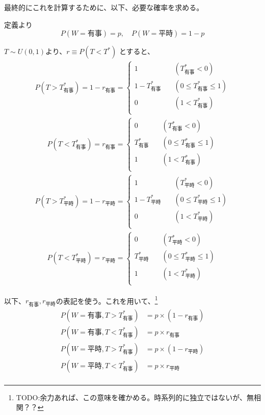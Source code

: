 \documentclass[main.tex]{subfiles}
\begin{document}
最終的にこれを計算するために、以下、必要な確率を求める。

定義より
$$P(W={有事}) = p, \quad P(W={平時}) = 1-p$$


$T \sim U(0,1)$より、$r \equiv P(T<T^*)$ とすると、 
\begin{align*}
    P(T>T^*_{有事}) = 1-r_{有事} = 
    \begin{cases}
        1 \quad &(T^*_{有事} < 0)\\
        1-T^*_{有事} \quad &(0\le T^*_{有事} \le 1)\\
        0 \quad &(1 < T^*_{有事} )\\
    \end{cases}
\end{align*}
\begin{align*}
    P(T<T^*_{有事}) = r_{有事} = 
    \begin{cases}
        0 \quad &(T^*_{有事} < 0)\\
        T^*_{有事} \quad &(0\le T^*_{有事} \le 1)\\
        1 \quad &(1 < T^*_{有事} )\\
    \end{cases}
\end{align*}
\begin{align*}
    P(T>T^*_{平時}) = 1-r_{平時} = 
    \begin{cases}
        1 \quad &(T^*_{平時} < 0)\\
        1-T^*_{平時} \quad &(0\le T^*_{平時} \le 1)\\
        0 \quad &(1 < T^*_{平時} )\\
    \end{cases}
\end{align*}
\begin{align*}
    P(T<T^*_{平時}) = r_{平時} = 
    \begin{cases}
        0 \quad &(T^*_{平時} < 0)\\
        T^*_{平時} \quad &(0\le T^*_{平時} \le 1)\\
        1 \quad &(1 < T^*_{平時} )\\
    \end{cases}
\end{align*}


以下、$r_{有事}, r_{平時}$の表記を使う。これを用いて、\footnote{TODO:余力あれば、この意味を確かめる。時系列的に独立ではないが、無相関？？}
\begin{align*}
    P(W=有事, T>T^*_{有事}) &= p × (1-r_{有事})\\
    P(W=有事, T<T^*_{有事}) &= p × r_{有事}\\
    P(W=平時, T>T^*_{有事}) &= p × (1-r_{平時})\\
    P(W=平時, T<T^*_{有事}) &= p × r_{平時}\\
\end{align*}
\end{document}

